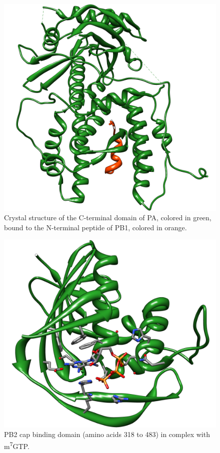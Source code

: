 \begin{figure}
\centering
\includegraphics[width=\linewidth]{Case/2ZNL.png}
\caption{Crystal structure of the C-terminal domain of PA, colored in green, bound to the N-terminal peptide of PB1, colored in orange.}
\label{Case:2ZNL}
\end{figure}

\begin{figure}
\centering
\includegraphics[width=\linewidth]{Case/2VQZ.png}
\caption{PB2 cap binding domain (amino acids 318 to 483) in complex with m\textsuperscript{7}GTP.}
\label{Case:2VQZ}
\end{figure}

